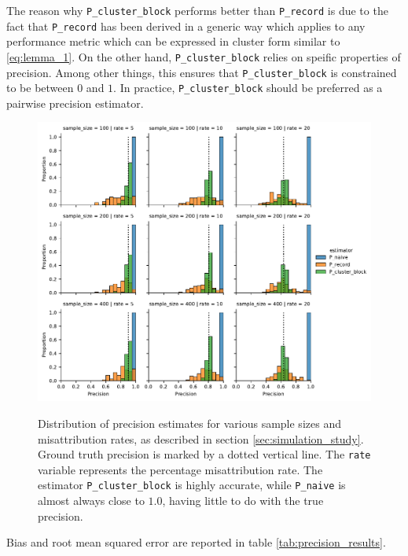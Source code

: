 \documentclass[fontsize=11pt]{article}
\theoremstyle{definition}
\begin{document}
The reason why \texttt{P\_cluster\_block} performs better than \texttt{P\_record} is due to the fact that \texttt{P\_record} has been derived in a generic way which applies to any performance metric which can be expressed in cluster form similar to \eqref{eq:lemma_1}. On the other hand, \texttt{P\_cluster\_block} relies on speific properties of precision. Among other things, this ensures that \texttt{P\_cluster\_block} is constrained to be between $0$ and $1$. In practice, \texttt{P\_cluster\_block} should be preferred as a pairwise precision estimator.

\begin{figure}
    \centering
        \caption{Distribution of precision estimates for various sample sizes and misattribution rates, as described in section \ref{sec:simulation_study}. Ground truth precision is marked by a dotted vertical line. The \texttt{rate} variable represents the percentage misattribution rate. The estimator \texttt{P\_cluster\_block} is highly accurate, while \texttt{P\_naive} is almost always close to $1.0$, having little to do with the true precision.}
    \includegraphics[width=\linewidth]{sim_records_precision}
    \label{fig:sim_records_precision}
\end{figure}

Bias and root mean squared error are reported in table \ref{tab:precision_results}.
\end{document}
